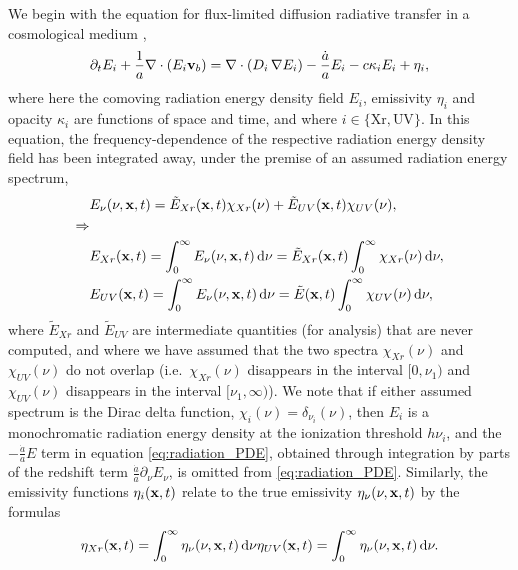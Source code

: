 \documentclass[letterpaper,10pt]{article}
\renewcommand{\(}{\left(}
\renewcommand{\)}{\right)}
\newcommand{\vb}{{\bf v}_b}
\newcommand{\xvec}{{\bf x}}
\begin{document}
We begin with the equation for flux-limited diffusion radiative
transfer in a cosmological medium \cite{ReynoldsHayesPaschosNorman2009},
\begin{equation}
\label{eq:radiation_PDE}
  \partial_{t} E_i + \frac1a \nabla\cdot\(E_i\vb\) =
    \nabla\cdot\(D_i\,\nabla E_i\) - \frac{\dot{a}}{a} E_i - c\kappa_i E_i + \eta_i,
\end{equation}
where here the comoving radiation energy density field $E_i$, emissivity
$\eta_i$ and opacity $\kappa_i$ are functions of space and time, and
where $i\in\{\text{Xr},\text{UV}\}$.  In this equation, the
frequency-dependence of the respective radiation energy density field
has been integrated away, under the premise of an assumed radiation
energy spectrum, 
\begin{align}
  \notag
  & E_{\nu}(\nu,\xvec,t) = \tilde{E}_{Xr}(\xvec,t) \chi_{Xr}(\nu) +
     \tilde{E}_{UV}(\xvec,t) \chi_{UV}(\nu), \\ 
  \notag
  \Rightarrow & \\
  \label{eq:spectrumXr}
  & E_{Xr}(\xvec,t) = \int_{0}^{\infty} E_{\nu}(\nu,\xvec,t)\,\mathrm{d}\nu 
    = \tilde{E}_{Xr}(\xvec,t) \int_{0}^{\infty}
    \chi_{Xr}(\nu)\,\mathrm{d}\nu, \\
  \label{eq:spectrumUV}
  & E_{UV}(\xvec,t) = \int_{0}^{\infty} E_{\nu}(\nu,\xvec,t)\,\mathrm{d}\nu 
    = \tilde{E}(\xvec,t) \int_{0}^{\infty} \chi_{UV}(\nu)\,\mathrm{d}\nu,
\end{align}
where $\tilde{E}_{Xr}$ and $\tilde{E}_{UV}$ are intermediate
quantities (for analysis) that are never computed, and where we have
assumed that the two spectra $\chi_{Xr}(\nu)$ and $\chi_{UV}(\nu)$ do
not overlap (i.e.~$\chi_{Xr}(\nu)$ disappears in the interval
$[0,\nu_{1})$ and $\chi_{UV}(\nu)$ disappears in the
interval $[\nu_{1},\infty)$).  We note that if either assumed spectrum
is the Dirac delta function, $\chi_i(\nu) = \delta_{\nu_i}(\nu)$, then
$E_i$ is a monochromatic radiation energy density at the ionization
threshold $h\nu_i$, and the $-\frac{\dot{a}}{a}E$ term in equation
\eqref{eq:radiation_PDE}, obtained through integration by parts of the
redshift term 
$\frac{\dot{a}}{a}\partial_{\nu}E_{\nu}$, is omitted from
\eqref{eq:radiation_PDE}. Similarly, the emissivity functions
$\eta_i(\xvec,t)$ relate to the true emissivity 
$\eta_{\nu}(\nu,\xvec,t)$ by the formulas
\begin{equation}
\label{eq:emissivity}
  \eta_{Xr}(\xvec,t) =
  \int_{0}^{\infty}\eta_{\nu}(\nu,\xvec,t)\,\mathrm{d}\nu \\
\notag
  \eta_{UV}(\xvec,t) =
  \int_{0}^{\infty}\eta_{\nu}(\nu,\xvec,t)\,\mathrm{d}\nu.
\end{equation}
\end{document}
